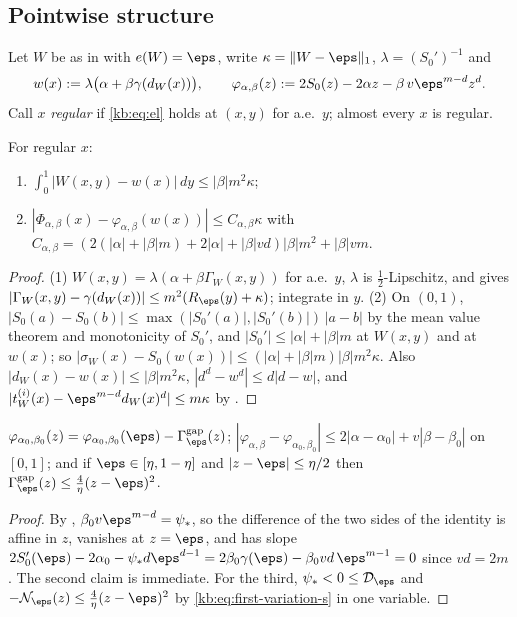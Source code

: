 \subsection{Pointwise structure}
\label{kb:sec:pointwise}

Let $W$ be as in  with $e(W)=\eps$, write $\kappa=\|W-\eps\|_1$,
$\lambda=(S_0')^{-1}$ and
\[
  w(x):=\lambda\bigl(\alpha+\beta\gamma(d_W(x))\bigr),\qquad
  \varphi_{\alpha,\beta}(z):=2S_0(z)-2\alpha z-\beta\,v\eps^{m-d}z^d .
\]
Call $x$ \emph{regular} if \eqref{kb:eq:el} holds at $(x,y)$ for a.e.\ $y$; almost every $x$ is
regular.

\begin{lemma}[Rows]\label{kb:lem:rows}
For regular $x$:
\begin{enumerate}
\item $\int_0^1|W(x,y)-w(x)|\,dy\le|\beta|m^2\kappa$;
\item $|\Phi_{\alpha,\beta}(x)-\varphi_{\alpha,\beta}(w(x))|\le C_{\alpha,\beta}\kappa$ with
  $C_{\alpha,\beta}=(2(|\alpha|+|\beta|m)+2|\alpha|+|\beta|vd)|\beta|m^2+|\beta|vm$.
\end{enumerate}
\end{lemma}

\begin{proof}
(1) $W(x,y)=\lambda(\alpha+\beta\Gamma_W(x,y))$ for a.e.\ $y$, $\lambda$ is $\frac12$-Lipschitz,
and  gives $|\Gamma_W(x,y)-\gamma(d_W(x))|\le m^2(R_\eps(y)+\kappa)$; integrate
in $y$.  (2) On $(0,1)$, $|S_0(a)-S_0(b)|\le\max(|S_0'(a)|,|S_0'(b)|)\,|a-b|$ by the mean value
theorem and monotonicity of $S_0'$, and $|S_0'|\le|\alpha|+|\beta|m$ at $W(x,y)$ and at $w(x)$; so
$|\sigma_W(x)-S_0(w(x))|\le(|\alpha|+|\beta|m)|\beta|m^2\kappa$.  Also
$|d_W(x)-w(x)|\le|\beta|m^2\kappa$, $|d^d-w^d|\le d|d-w|$, and
$|t^{(i)}_W(x)-\eps^{m-d}d_W(x)^d|\le m\kappa$ by .
\end{proof}

\begin{lemma}\label{kb:lem:profile}
$\varphi_{\alpha_0,\beta_0}(z)=\varphi_{\alpha_0,\beta_0}(\eps)-\Gamma^{\mathrm{gap}}_\eps(z)$;
$|\varphi_{\alpha,\beta}-\varphi_{\alpha_0,\beta_0}|\le2|\alpha-\alpha_0|+v|\beta-\beta_0|$ on $[0,1]$;
and if $\eps\in[\eta,1-\eta]$ and $|z-\eps|\le\eta/2$ then
$\Gamma^{\mathrm{gap}}_\eps(z)\le\frac4\eta(z-\eps)^2$.
\end{lemma}

\begin{proof}
By , $\beta_0v\eps^{m-d}=\psi_*$, so the difference of the two sides of the
identity is affine in $z$, vanishes at $z=\eps$, and has slope
$2S_0'(\eps)-2\alpha_0-\psi_*d\eps^{d-1}=2\beta_0\gamma(\eps)-\beta_0vd\,\eps^{m-1}=0$ since
$vd=2m$.  The second claim is immediate.  For the third, $\psi_*<0\le\mathcal D_\eps$ and
$-\mathcal N_\eps(z)\le\frac4\eta(z-\eps)^2$ by \eqref{kb:eq:first-variation-s} in one variable.
\end{proof}

